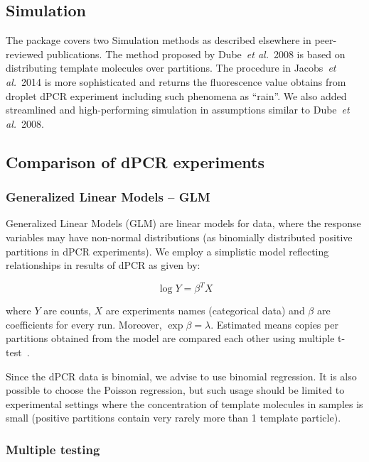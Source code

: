 \documentclass[a4,center,fleqn]{NAR}
\begin{document}
\subsection{Simulation}

The package covers two Simulation methods as described elsewhere in 
peer-reviewed publications. The method proposed by Dube~\textit{et al.}~2008 
\cite{dube_mathematical_2008} is based on distributing template molecules over 
partitions. The procedure in Jacobs~\textit{et al.}~2014 \cite{jacobs_2014} is 
more sophisticated and returns the fluorescence value obtains from droplet dPCR 
experiment including such phenomena as ``rain''. We also added streamlined and 
high-performing simulation in assumptions similar to Dube~\textit{et al.}~2008.

\subsection{Comparison of dPCR experiments}

\subsubsection[]{Generalized Linear Models -- GLM}

Generalized Linear Models (GLM) are linear models for data, where the response 
variables may have non-normal distributions (as binomially distributed positive 
partitions in dPCR experiments). We employ a simplistic model reflecting 
relationships in results of dPCR as given by:

\begin{equation}
\log{Y} = \beta^T X
\end{equation}

where $Y$ are counts, $X$ are experiments names (categorical data) and $\beta$ 
are coefficients for every run. Moreover, $\exp{\beta} = 
\lambda$. Estimated means copies per partitions obtained from the model are 
compared each other using multiple t-test~\citep{bretz_2010}.

Since the dPCR data is binomial, we advise to use binomial regression. It is 
also possible to choose the Poisson regression, but such usage should be limited to 
experimental settings where the concentration of template molecules in samples is 
small (positive partitions contain very rarely more than 1 template particle). 

\subsubsection[]{Multiple testing}
\end{document}
